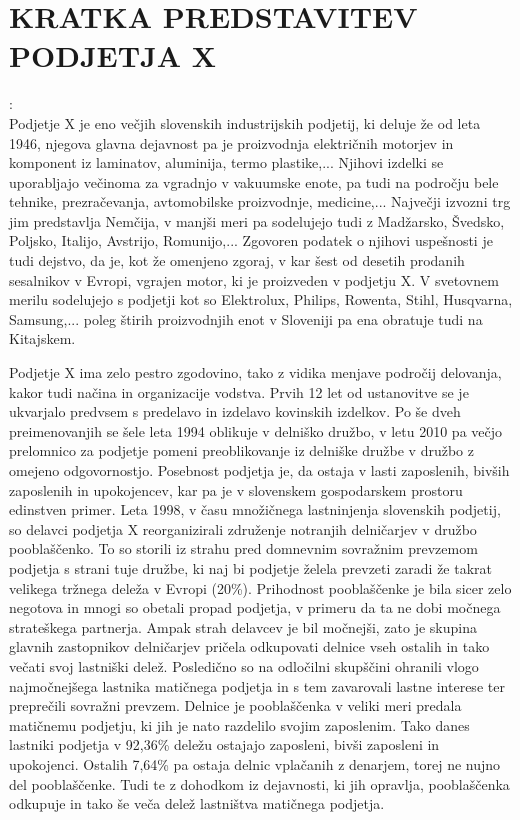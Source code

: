 \documentclass[12pt,a4paper]{amsart}
\theoremstyle{definition} %
\theoremstyle{plain} %
\begin{document}


\section{\textbf{KRATKA PREDSTAVITEV PODJETJA X}}:\\

Podjetje X je eno večjih slovenskih industrijskih podjetij, ki deluje že od leta 1946, njegova glavna dejavnost pa je proizvodnja električnih motorjev in komponent iz laminatov, aluminija, termo plastike,... Njihovi izdelki se uporabljajo večinoma za vgradnjo v vakuumske enote, pa tudi na področju bele tehnike, prezračevanja, avtomobilske proizvodnje, medicine,...
Največji izvozni trg jim predstavlja Nemčija, v manjši meri pa sodelujejo tudi z Madžarsko, Švedsko, Poljsko, Italijo, Avstrijo, Romunijo,... Zgovoren podatek o njihovi uspešnosti je tudi dejstvo, da je, kot že omenjeno zgoraj, v kar šest od desetih prodanih sesalnikov v Evropi, vgrajen motor, ki je proizveden v podjetju X. V svetovnem merilu sodelujejo s podjetji kot so Elektrolux, Philips, Rowenta, Stihl, Husqvarna, Samsung,... poleg štirih proizvodnjih enot v Sloveniji pa ena obratuje tudi na Kitajskem.\par
Podjetje X ima zelo pestro zgodovino, tako z vidika menjave področij delovanja, kakor tudi načina in organizacije vodstva. Prvih 12 let od ustanovitve se je ukvarjalo predvsem s predelavo in izdelavo kovinskih izdelkov. Po še dveh preimenovanjih se šele leta 1994 oblikuje v delniško družbo, v letu 2010 pa večjo prelomnico za podjetje pomeni preoblikovanje iz delniške družbe v družbo z omejeno odgovornostjo. Posebnost podjetja je, da ostaja v lasti zaposlenih, bivših zaposlenih in upokojencev, kar pa je v slovenskem gospodarskem prostoru edinstven primer. Leta 1998, v času množičnega lastninjenja slovenskih podjetij, so delavci podjetja X reorganizirali združenje notranjih delničarjev v družbo pooblaščenko. To so storili iz strahu pred domnevnim sovražnim prevzemom podjetja s strani tuje družbe, ki naj bi podjetje želela prevzeti zaradi že takrat velikega tržnega deleža v Evropi (20\%). Prihodnost pooblaščenke je bila sicer zelo negotova in mnogi so obetali propad podjetja, v primeru da ta ne dobi močnega strateškega partnerja. Ampak strah delavcev je bil močnejši, zato je skupina glavnih zastopnikov delničarjev pričela odkupovati delnice vseh ostalih in tako večati svoj lastniški delež. Posledično so na odločilni skupščini ohranili vlogo najmočnejšega lastnika matičnega podjetja in s tem zavarovali lastne interese ter preprečili sovražni prevzem. Delnice je pooblaščenka v veliki meri predala matičnemu podjetju, ki jih je nato razdelilo svojim zaposlenim. Tako danes lastniki podjetja v 92,36\% deležu ostajajo zaposleni, bivši zaposleni in upokojenci. Ostalih 7,64\% pa ostaja delnic vplačanih z denarjem, torej ne nujno del pooblaščenke. Tudi te z dohodkom iz dejavnosti, ki jih opravlja, pooblaščenka odkupuje in tako še veča delež lastništva matičnega podjetja. \\
\end{document}
